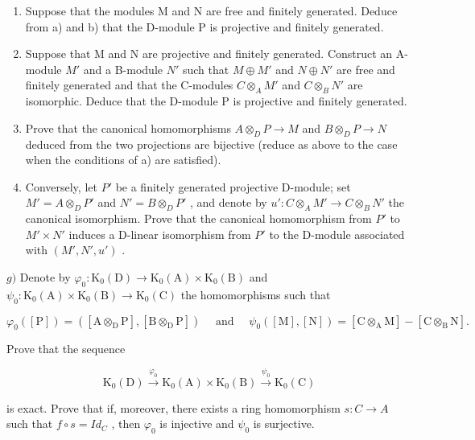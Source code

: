 \begin{enumerate}
\def\labelenumi{\alph{enumi})}
\setcounter{enumi}{2}
\item
  Suppose that the modules M and N are free and finitely generated. Deduce from a) and b) that the D-module P is projective and finitely generated.
\item
  Suppose that M and N are projective and finitely generated. Construct an A-module \(M'\) and a B-module \(N'\) such that \(M \oplus M'\) and \(N \oplus N'\) are free and finitely generated and that the C-modules \(C \otimes_{A} M'\) and \(C \otimes_{B} N'\) are isomorphic. Deduce that the D-module P is projective and finitely generated.
\item
  Prove that the canonical homomorphisms \(A \otimes_{D} P \to M\) and \(B \otimes_{D} P \to N\) deduced from the two projections are bijective (reduce as above to the case when the conditions of a) are satisfied).
\item
  Conversely, let \(P'\) be a finitely generated projective D-module; set \(M' = A \otimes_{D} P'\) and \(N' = B \otimes_{D} P'\) , and denote by \(u' : C \otimes_{A} M' \to C \otimes_{B} N'\) the canonical isomorphism. Prove that the canonical homomorphism from \(P'\) to \(M' \times N'\) induces a D-linear isomorphism from \(P'\) to the D-module associated with \((M', N', u')\) .
\end{enumerate}

\(g)\) Denote by \(\varphi_0:\mathrm{K}_0(\mathrm{D})\to \mathrm{K}_0(\mathrm{A})\times \mathrm{K}_0(\mathrm{B})\) and \(\psi_0:\mathrm{K}_0(\mathrm{A})\times \mathrm{K}_0(\mathrm{B})\to \mathrm{K}_0(\mathrm{C})\) the homomorphisms such that

\[
\varphi_ {0} ([ \mathrm{P} ]) = ([ \mathrm{A} \otimes_ {\mathrm{D}} \mathrm{P} ], [ \mathrm{B} \otimes_ {\mathrm{D}} \mathrm{P} ]) \quad \text { and } \quad \psi_ {0} ([ \mathrm{M} ], [ \mathrm{N} ]) = [ \mathrm{C} \otimes_ {\mathrm{A}} \mathrm{M} ] - [ \mathrm{C} \otimes_ {\mathrm{B}} \mathrm{N} ].
\]

Prove that the sequence

\[
\mathrm{K} _ {0} (\mathrm{D}) \xrightarrow {\varphi_ {0}} \mathrm{K} _ {0} (\mathrm{A}) \times \mathrm{K} _ {0} (\mathrm{B}) \xrightarrow {\psi_ {0}} \mathrm{K} _ {0} (\mathrm{C})
\]

is exact. Prove that if, moreover, there exists a ring homomorphism \(s: C \to A\) such that \(f \circ s = Id_{C}\) , then \(\varphi_{0}\) is injective and \(\psi_{0}\) is surjective.

